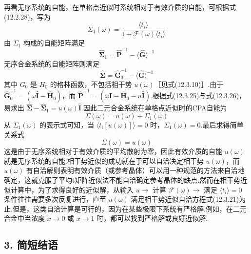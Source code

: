 再看无序系统的自能，在单格点近似时系统相对于有效介质的自能，可根据式(12.2.28)，写为
\begin{equation}
  \Sigma_{1}\left(\omega\right)=\frac{\langle t_{i}\rangle}
  {1+\mathscr{F}\left(\omega\right)\langle t_{i}\rangle}
\end{equation}
由 $\Sigma_{1}$ 构成的自能矩阵满足
\begin{equation}
  \hat{\boldsymbol{\Sigma}}_{1}=\hat{\boldsymbol{P}}^{-1}-\langle\hat{\boldsymbol{G}}\rangle^{-1}
\end{equation}
无序合金系统的自能矩阵则满足
\begin{equation}
  \hat{\boldsymbol{\Sigma}}=\hat{\boldsymbol{G}}_{0}^{-1}-\langle\hat{\boldsymbol{G}}\rangle^{-1}
\end{equation}
其中 $G_{0}$ 是 $H_{0}$ 的格林函数，不包括相干势 $u\left(\omega\right)$［见式(12.3.10)］.由于 $\hat{\boldsymbol{G}}_{0}^{-1}=\left(\omega\hat{\boldsymbol{I}}-\hat{\boldsymbol{H}}_{0}\right)$，而 $\hat{\boldsymbol{P}}^{-1}=\left(\omega\hat{\boldsymbol{I}}-\hat{\boldsymbol{H}}_{0}-u\hat{\boldsymbol{I}}\right)$.根据式(12.3.25)与式(12.3.26)，易求出 $\hat{\boldsymbol{\Sigma}}-\hat{\boldsymbol{\Sigma}}_{1}=u\left(\omega\right)\hat{\boldsymbol{I}}$.因此二元合金系统在单格点近似时的CPA自能为
\begin{equation}
  \Sigma\left(\omega\right)=u\left(\omega\right)+\Sigma_{1}\left(\omega\right)
\end{equation}
从 $\Sigma_{1}\left(\omega\right)$ 的表示式可知，当 $\langle t_{i}\left[u\left(\omega\right)\right]\rangle=0$ 时，$\Sigma_{1}\left(\omega\right)=0$.最后求得简单关系式
\begin{equation}
  \Sigma\left(\omega\right)=u\left(\omega\right)
\end{equation}
这是由于无序系统相对于有效介质的平均散射为零，因此有效介质的自能 $u\left(\omega\right)$ 就是无序系统的自能.相干势近似的成功就在于可以自洽决定相干势 $u\left(\omega\right)$，而 $u\left(\omega\right)$ 有自洽解则表明有效介质（或参考晶体）可以用一种规范的方法来自洽地确定，这就克服了平均t矩阵近似法不能自洽确定参考晶体的缺点.然而在相干势近似计算中，为了求得良好的近似解，从输入 $u\rightarrow$ 计算 $\mathscr{F}\left(\omega\right)\rightarrow$ 满足 $\langle t_{i}\rangle=0$ 条件往往需要多次反复进行，直至 $u\left(\omega\right)$ 满足相干势近似自洽方程式(12.3.21)为止.但是，这类自洽计算是可行的，因为在某些极限下系统有严格解.例如，在二元合金中当浓度 $x\rightarrow0$ 或 $x\rightarrow1$ 时，都可以找到严格解或良好近似解.

\subsection*{3. 简短结语}

